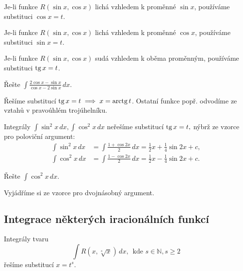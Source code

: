 \begin{veta}
    Je-li funkce $R(\sin x, \cos x)$ lichá vzhledem k
    proměnné $\sin x$, používáme substituci $\cos x=t$.
\end{veta}

\begin{veta}
    Je-li funkce $R(\sin x, \cos x)$ lichá vzhledem k
    proměnné $\cos x$, používáme substituci $\sin x=t$.
\end{veta}

\begin{veta}
    Je-li funkce $R(\sin x, \cos x)$ sudá vzhledem k
    oběma proměnným, používáme substituci $\operatorname{tg} x=t$.
\end{veta}

\begin{priklad}
Řešte $\int \frac{2\cos x - \sin x}{\cos x - 2\sin x}\, dx$.
\end{priklad}

\begin{reseni}
Řešíme substitucí $\operatorname{tg} x = t \implies x=\operatorname{arctg} t$. Ostatní funkce popř.
odvodíme ze vztahů v pravoúhlém trojúhelníku.
\end{reseni}

\begin{pozn}
    Integrály $\int \sin^2 x \, dx, \int \cos^2 x \, dx$ neřešíme substitucí
    $\operatorname{tg} x  = t,$ nýbrž ze vzorce pro poloviční argument:
    \begin{align*}
        \int \sin^2 x \, dx &= \int \frac{1+\cos 2x}{2}\, dx = \frac{1}{2}x + \frac{1}{4} \sin 2x + c, \\
        \int \cos^2 x \, dx &= \int \frac{1-\cos 2x}{2}\, dx = \frac{1}{2}x - \frac{1}{4} \sin 2x + c.
    \end{align*}
\end{pozn}

\begin{priklad}
Řešte $\int \cos^2 x \, dx$.
\end{priklad}

\begin{reseni}
Vyjádříme si ze vzorce pro dvojnásobný argument.
\end{reseni}

\subsection*{Integrace některých iracionálních funkcí}
\begin{veta}
    Integrály tvaru
    $$\int R(x,\sqrt[s]{x}) \, dx, \,\,\, \textrm{kde } s \in \mathbb N, s \geq 2$$
    řešíme substitucí $x=t^s$.
\end{veta}

